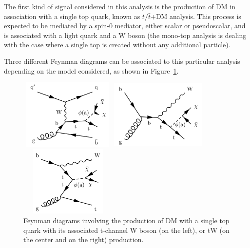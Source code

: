 \documentclass[a4paper, 10pt, openright]{report}
\begin{document}
The first kind of signal considered in this analysis is the production of \ac{DM} in association with a single top quark, known as $t/\bar t$+DM analysis. This process is expected to be mediated by a spin-0 mediator, either scalar or pseudoscalar, and is associated with a light quark and a W boson (the mono-top analysis is dealing with the case where a single top is created without any additional particle). 

Three different Feynman diagrams can be associated to this particular analysis depending on the model considered, as shown in Figure~\ref{fig:singleTopFeynman}.

\begin{figure}[htbp]
\centering
\begin{minipage}[b]{.3\textwidth}
\includegraphics[width=4.8cm, height=3.5cm]{figs/tDMa.png}
\end{minipage}\qquad
\begin{minipage}[b]{.3\textwidth}
\includegraphics[width=4.8cm, height=3.5cm]{figs/tDMb.png}
\end{minipage}
\begin{minipage}[b]{.28\textwidth}
\includegraphics[width=4.8cm, height=3.5cm]{figs/tDMc.png}
\end{minipage}
\caption{Feynman diagrams involving the production of \ac{DM} with a single top quark with its associated t-channel W boson (on the left), or tW (on the center and on the right) production.}
\label{fig:singleTopFeynman}
\end{figure}
\end{document}
